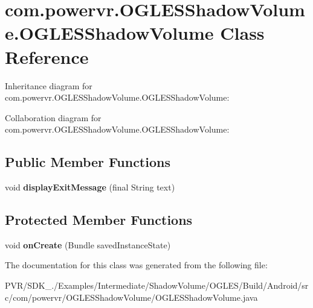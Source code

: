 \hypertarget{classcom_1_1powervr_1_1_o_g_l_e_s_shadow_volume_1_1_o_g_l_e_s_shadow_volume}{\section{com.\+powervr.\+O\+G\+L\+E\+S\+Shadow\+Volume.\+O\+G\+L\+E\+S\+Shadow\+Volume Class Reference}
\label{classcom_1_1powervr_1_1_o_g_l_e_s_shadow_volume_1_1_o_g_l_e_s_shadow_volume}
}


Inheritance diagram for com.\+powervr.\+O\+G\+L\+E\+S\+Shadow\+Volume.\+O\+G\+L\+E\+S\+Shadow\+Volume\+:


Collaboration diagram for com.\+powervr.\+O\+G\+L\+E\+S\+Shadow\+Volume.\+O\+G\+L\+E\+S\+Shadow\+Volume\+:
\subsection*{Public Member Functions}
\begin{DoxyCompactItemize}
\item 
\hypertarget{classcom_1_1powervr_1_1_o_g_l_e_s_shadow_volume_1_1_o_g_l_e_s_shadow_volume_ab84f53797dc88cea625662031d2f4b96}{void {\bfseries display\+Exit\+Message} (final String text)}\label{classcom_1_1powervr_1_1_o_g_l_e_s_shadow_volume_1_1_o_g_l_e_s_shadow_volume_ab84f53797dc88cea625662031d2f4b96}

\end{DoxyCompactItemize}
\subsection*{Protected Member Functions}
\begin{DoxyCompactItemize}
\item 
\hypertarget{classcom_1_1powervr_1_1_o_g_l_e_s_shadow_volume_1_1_o_g_l_e_s_shadow_volume_aec9983186e379044104dffff7fd06cf6}{void {\bfseries on\+Create} (Bundle saved\+Instance\+State)}\label{classcom_1_1powervr_1_1_o_g_l_e_s_shadow_volume_1_1_o_g_l_e_s_shadow_volume_aec9983186e379044104dffff7fd06cf6}

\end{DoxyCompactItemize}


The documentation for this class was generated from the following file\+:\begin{DoxyCompactItemize}
\item 
P\+V\+R/\+S\+D\+K\+\_./\+Examples/\+Intermediate/\+Shadow\+Volume/\+O\+G\+L\+E\+S/\+Build/\+Android/src/com/powervr/\+O\+G\+L\+E\+S\+Shadow\+Volume/O\+G\+L\+E\+S\+Shadow\+Volume.\+java\end{DoxyCompactItemize}
